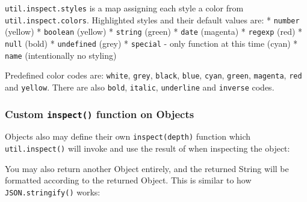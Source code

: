 \texttt{util.inspect.styles} is a map assigning each style a color from
\texttt{util.inspect.colors}. Highlighted styles and their default
values are: * \texttt{number} (yellow) * \texttt{boolean} (yellow) *
\texttt{string} (green) * \texttt{date} (magenta) * \texttt{regexp}
(red) * \texttt{null} (bold) * \texttt{undefined} (grey) *
\texttt{special} - only function at this time (cyan) * \texttt{name}
(intentionally no styling)

Predefined color codes are: \texttt{white}, \texttt{grey},
\texttt{black}, \texttt{blue}, \texttt{cyan}, \texttt{green},
\texttt{magenta}, \texttt{red} and \texttt{yellow}. There are also
\texttt{bold}, \texttt{italic}, \texttt{underline} and \texttt{inverse}
codes.

\subsubsection{\texorpdfstring{Custom \texttt{inspect()} function on
Objects}{Custom inspect() function on Objects}}\label{custom-inspect-function-on-objects}

Objects also may define their own \texttt{inspect(depth)} function which
\texttt{util.inspect()} will invoke and use the result of when
inspecting the object:

\begin{Shaded}
\begin{Highlighting}[]
 \NormalTok{(}\NormalTok{);}

 \NormalTok{: } \NormalTok{\};}
 \NormalTok{= }
    \NormalTok{+ } \NormalTok{+ }\NormalTok{;}
\NormalTok{\};}

\end{Highlighting}
\end{Shaded}

You may also return another Object entirely, and the returned String
will be formatted according to the returned Object. This is similar to
how \texttt{JSON.stringify()} works:

\begin{Shaded}
\begin{Highlighting}[]
 \NormalTok{: } \NormalTok{\};}
 \NormalTok{= }
   \NormalTok{\{ }\NormalTok{: } \NormalTok{\};}
\NormalTok{\};}

\end{Highlighting}
\end{Shaded}

